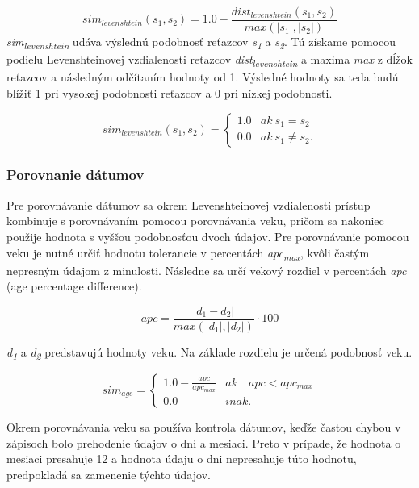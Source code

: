 \begin{equation*}
    sim_{levenshtein}(s_1,s_2) =  1.0 - \frac{ dist_{levenshtein}(s_1,s_2)}{ max(|s_1|,|s_2|)}
\end{equation*}
\newpage
\textit{sim\textsubscript{levenshtein}} udáva výslednú podobnosť reťazcov \textit{s\textsubscript{1}} a \textit{s\textsubscript{2}}. Tú získame pomocou podielu
Levenshteinovej vzdialenosti reťazcov \textit{dist\textsubscript{levenshtein}} a maxima \textit{max} z dĺžok reťazcov a následným odčítaním hodnoty od 1. Výsledné hodnoty sa teda budú blížiť 1 pri vysokej
podobnosti reťazcov a 0 pri nízkej podobnosti.

\begin{equation*}
    sim_{levenshtein}(s_1,s_2) = 
\begin{cases} 1.0  &  ak \ s_1 = s_2 \\
              0.0  &  ak \ s_1 \neq s_2. \end{cases}
\end{equation*}  

\subsubsection{Porovnanie dátumov}
Pre porovnávanie dátumov sa okrem Levenshteinovej vzdialenosti prístup kombinuje
s porovnávaním pomocou porovnávania veku, pričom sa nakoniec použije hodnota s vyššou
podobnosťou dvoch údajov. Pre porovnávanie pomocou veku je nutné určiť hodnotu
tolerancie v percentách \textit{apc\textsubscript{max}}, kvôli častým nepresným údajom z minulosti. Následne sa
určí vekový rozdiel v percentách \textit{apc} (age percentage difference).

\begin{equation*}
    apc =  \frac{ |d_1 - d_2|}{ max(|d_1|,|d_2|)} \cdot 100
\end{equation*}

\textit{d\textsubscript{1}} a \textit{d\textsubscript{2}} predstavujú hodnoty veku. Na základe rozdielu je určená podobnosť veku.

\begin{equation*}
    sim_{age} = 
\begin{cases} 1.0 -  \frac{ apc}{ apc_{max}} &  ak \quad apc < apc_{max} \\
              0.0  &  inak. \end{cases}
\end{equation*}

Okrem porovnávania veku sa používa kontrola dátumov, keďže častou chybou v zápisoch
bolo prehodenie údajov o dni a mesiaci. Preto v prípade, že hodnota o mesiaci presahuje 12
a hodnota údaju o dni nepresahuje túto hodnotu, predpokladá sa zamenenie týchto údajov.

